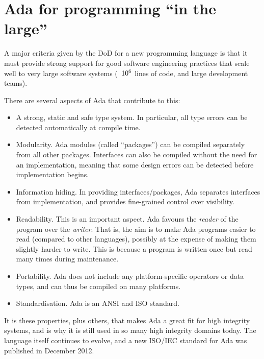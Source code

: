 \section{Ada for programming ``in the large''}
   
A major criteria given by the DoD for a new programming language is that it must provide strong support for good software engineering 
  practices that scale well to very large software systems (~\(\rm
  10^6\) lines of code, and large development teams).

There are several aspects of Ada that contribute to this:

 \begin{itemize}

    \item A strong, static and safe type system. In particular, all type errors can be detected automatically at compile time.

  \item Modularity. Ada modules (called ``packages'') can be compiled separately from all other packages. Interfaces can also be compiled without the need for an implementation, meaning that some design errors can be detected before implementation begins.

  \item Information hiding. In providing interfaces/packages, Ada separates interfaces from implementation, and provides fine-grained control over visibility.

  \item Readability. This is an important aspect. Ada favours the \emph{reader} of the program over the \emph{writer}.  That is, the aim is to make Ada programs easier to read (compared to other languages), possibly at the expense of making them slightly harder to write. This is because a program is written once but read many times during maintenance.

  \item Portability. Ada does not include any platform-specific operators or data types, and can thus be compiled on many platforms.
  
  \item Standardisation. Ada is an ANSI and ISO standard.

  \end{itemize}

It is these properties, plus others, that makes Ada a great fit for high integrity systems, and is why it is still used in so many high integrity domains today. The language itself continues to evolve, and a new ISO/IEC standard for Ada was published in December 2012.

